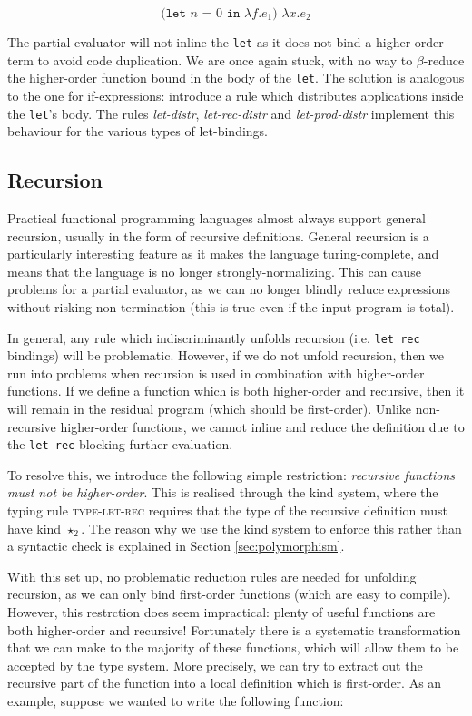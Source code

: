 \documentclass[runningheads]{llncs}
\begin{document}
\begin{equation*}
  \texttt{(let $n$ = $0$ in $\lambda f. e_1$) $\lambda x. e_2$}
\end{equation*}

The partial evaluator will not inline the \texttt{let} as it does not bind a higher-order term to avoid code duplication. We are once again stuck, with no way to $\beta$-reduce the higher-order function bound in the body of the \texttt{let}. The solution is analogous to the one for if-expressions: introduce a rule which distributes applications inside the \texttt{let}'s body. The rules \textit{let-distr}, \textit{let-rec-distr} and \textit{let-prod-distr} implement this behaviour for the various types of let-bindings.


\subsection{Recursion} \label{sec:recursion}

Practical functional programming languages almost always support general recursion, usually in the form of recursive definitions. General recursion is a particularly interesting feature as it makes the language turing-complete, and means that the language is no longer strongly-normalizing. This can cause problems for a partial evaluator, as we can no longer blindly reduce expressions without risking non-termination (this is true even if the input program is total).

In general, any rule which indiscriminantly unfolds recursion (i.e. \texttt{let rec} bindings) will be problematic. However, if we do not unfold recursion, then we run into problems when recursion is used in combination with higher-order functions. If we define a function which is both higher-order and recursive, then it will remain in the residual program (which should be first-order). Unlike non-recursive higher-order functions, we cannot inline and reduce the definition due to the \texttt{let rec} blocking further evaluation.

To resolve this, we introduce the following simple restriction: \emph{recursive functions must not be higher-order}. This is realised through the kind system, where the typing rule \textsc{type-let-rec} requires that the type of the recursive definition must have kind $\star_2$. The reason why we use the kind system to enforce this rather than a syntactic check is explained in Section \ref{sec:polymorphism}.

With this set up, no problematic reduction rules are needed for unfolding recursion, as we can only bind first-order functions (which are easy to compile). However, this restrction does seem impractical: plenty of useful functions are both higher-order and recursive! Fortunately there is a systematic transformation that we can make to the majority of these functions, which will allow them to be accepted by the type system. More precisely, we can try to extract out the recursive part of the function into a local definition which is first-order. As an example, suppose we wanted to write the following function:
\end{document}
